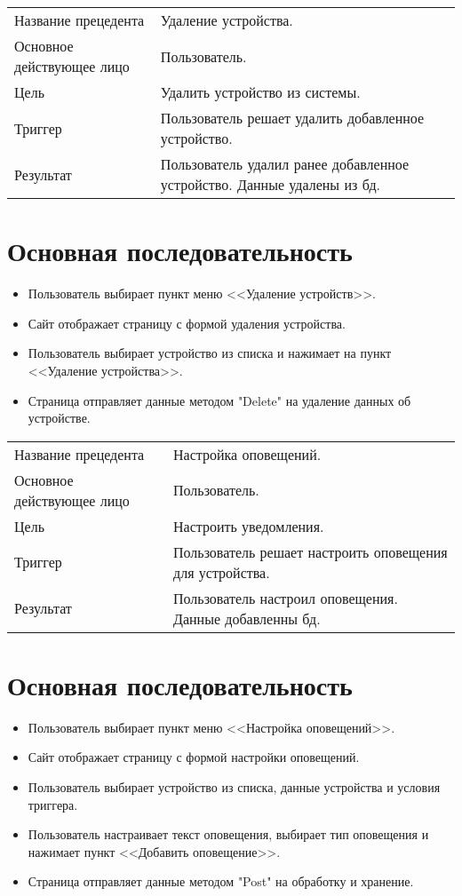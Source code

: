 \begin{table}[]
    \begin{tabular}{ll}
    Название прецедента       & Удаление устройства.\\
    Основное действующее лицо & Пользователь.\\
    Цель                      & Удалить устройство из системы.\\
    Триггер                   & Пользователь решает удалить добавленное устройство.\\
    Результат                 & Пользователь удалил ранее добавленное устройство. Данные удалены из бд.
    \end{tabular}
\end{table}

\section{Основная последовательность}
\begin{itemize}
    \item Пользователь выбирает пункт меню <<Удаление устройств>>.
    \item Сайт отображает страницу с формой удаления устройства.
    \item Пользователь выбирает устройство из списка и нажимает на пункт <<Удаление устройства>>.
    \item Страница отправляет данные методом "Delete" на удаление данных об устройстве. 
\end{itemize}

\begin{table}[]
    \begin{tabular}{ll}
    Название прецедента       & Настройка оповещений.\\
    Основное действующее лицо & Пользователь.\\
    Цель                      & Настроить уведомления.\\
    Триггер                   & Пользователь решает настроить оповещения для устройства.\\
    Результат                 & Пользователь настроил оповещения. Данные добавленны бд.
    \end{tabular}
\end{table}

\section{Основная последовательность}
\begin{itemize}
    \item Пользователь выбирает пункт меню <<Настройка оповещений>>.
    \item Сайт отображает страницу с формой настройки оповещений.
    \item Пользователь выбирает устройство из списка, данные устройства и условия триггера.
    \item Пользователь настраивает текст оповещения, выбирает тип оповещения и нажимает пункт <<Добавить оповещение>>. 
    \item Страница отправляет данные методом "Post" на обработку и хранение. 
\end{itemize}
